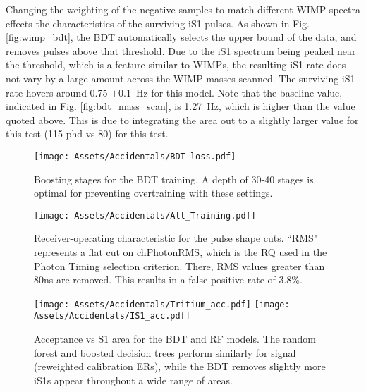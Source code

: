 Changing the weighting of the negative samples to match different WIMP spectra effects the characteristics of the surviving iS1 pulses. 
As shown in Fig. \ref{fig:wimp_bdt}, the BDT automatically selects the upper bound  of the data, and removes pulses above that threshold.
Due to the iS1 spectrum being peaked near the threshold, which is a feature similar to WIMPs, the resulting iS1 rate does not vary by a large amount across the WIMP masses scanned.
The surviving iS1 rate hovers around 0.75 $\pm0.1$~Hz for this model.
Note that the baseline value, indicated in Fig. \ref{fig:bdt_mass_scan}, is 1.27~Hz, which is higher than the value quoted above.
This is due to integrating the area out to a slightly larger value for this test (115 phd vs 80) for this test.


\begin{figure}
    \centering
    \texttt{[image: Assets/Accidentals/BDT\_loss.pdf]}
    \caption[Boosting stages for the BDT training.]%
    {Boosting stages for the BDT training.
    A depth of 30-40 stages is optimal for preventing overtraining with these settings.}
    \label{fig:boosting}
\end{figure}
\begin{figure}
    \centering
    \texttt{[image: Assets/Accidentals/All\_Training.pdf]}
    \caption[Receiver-operating characteristic for the pulse shape cuts.]%
    {Receiver-operating characteristic for the pulse shape cuts.
    ``RMS" represents a flat cut on chPhotonRMS, which is the RQ used in the Photon Timing selection criterion. 
    There, RMS values greater than 80ns are removed.
    This results in a false positive rate of 3.8\%. }
    \label{fig:roc_curve}
\end{figure}
\begin{figure}
    \centering
    \texttt{[image: Assets/Accidentals/Tritium\_acc.pdf]}
    \texttt{[image: Assets/Accidentals/IS1\_acc.pdf]}
    \caption[Event acceptance vs S1 area for the BDT and RF models.]%
    {Acceptance vs S1 area for the BDT and RF models.
    The random forest and boosted decision trees perform similarly for signal (reweighted calibration ERs), while the BDT removes slightly more iS1s appear throughout a wide range of areas. }
    \label{fig:s1_acc}
\end{figure}

